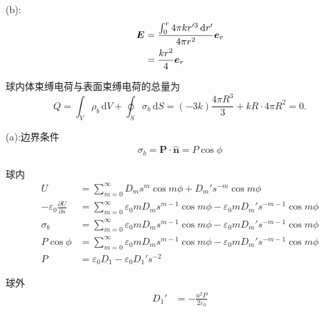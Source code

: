 (b):
\begin{align*}
    \boldsymbol{E}&=\frac{\int_{0}^{r}4\pi kr'^3\dif r'}{4\pi r^2}\boldsymbol{e}_r\\
    &=\frac{ kr^2}{4}\boldsymbol{e}_r
\end{align*}

球内体束缚电荷与表面束缚电荷的总量为
\[
Q
=
\int_V \rho_b\,\mathrm dV
+
\oint_S \sigma_b\,\mathrm dS
=
(-3k)\frac{4\pi R^3}{3}
+
kR\cdot 4\pi R^2
=0.
\]


(a):边界条件
\begin{align*}
    \sigma_b=\boldsymbol{P}\cdot\boldsymbol{\hat{n}}=P\cos \phi
\end{align*}

球内
\begin{align*}
    U&=\sum_{m=0}^{\infty}D_ms^{m}\cos m\phi+D_m's^{-m}\cos m\phi\\
    -\varepsilon_0\frac{\partial U}{\partial s}
    &=\sum_{m=0}^{\infty}\varepsilon_0mD_ms^{m-1}\cos m\phi
    -\varepsilon_0mD_m's^{-m-1}\cos m\phi\\
    \sigma_b
    &=\sum_{m=0}^{\infty}\varepsilon_0mD_ms^{m-1}\cos m\phi
    -\varepsilon_0mD_m's^{-m-1}\cos m\phi\\
    P\cos \phi
    &=\sum_{m=0}^{\infty}\varepsilon_0mD_ms^{m-1}\cos m\phi
    -\varepsilon_0mD_m's^{-m-1}\cos m\phi\\
    P&=\varepsilon_0D_1
    -\varepsilon_0D_1's^{-2}
\end{align*}

球外
\begin{align*}
    D_1'&=-\frac{a^2P}{2\varepsilon_0}
\end{align*}

